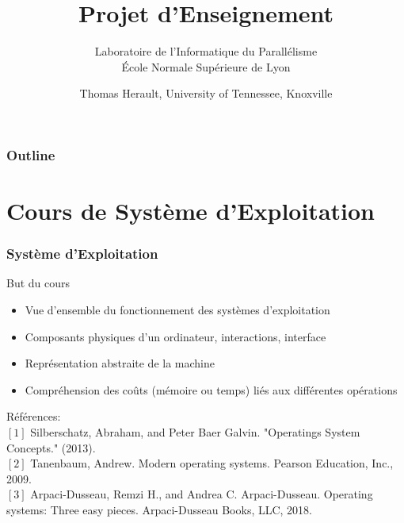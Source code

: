 \documentclass[compress,aspectratio=169]{beamer}
\title[Rencontre avec le Departement d'Informatique]{Projet d'Enseignement}
\subtitle{
  Laboratoire de l'Informatique du Parall\'elisme\\
  \'Ecole Normale Sup\'erieure de Lyon}
\author[herault@icl.utk.edu]{Thomas Herault, University of Tennessee, Knoxville}
\date[13 Mai 2024]{}
\begin{document}
\begin{frame}
  \titlepage
\end{frame}

\begin{frame}
     \frametitle{Outline}
     \tiny
        \tableofcontents
\end{frame}

\section{Cours de Syst\`eme d'Exploitation}

\begin{frame}
  \frametitle{Syst\`eme d'Exploitation}
  
  \begin{beamerboxesrounded}{But du cours}
    \begin{itemize}
    \item Vue d'ensemble du fonctionnement des syst\`emes d'exploitation
    \item Composants physiques d'un ordinateur, interactions, interface
    \item Repr\'esentation abstraite de la machine
    \item Compr\'ehension des co\^uts (m\'emoire ou temps) li\'es aux diff\'erentes op\'erations 
    \end{itemize}
  \end{beamerboxesrounded}
  
  \bigskip
  
  \small R\'ef\'erences:\\
  $[1]$ Silberschatz, Abraham, and Peter Baer Galvin. "Operatings System Concepts." (2013).\\
  $[2]$ Tanenbaum, Andrew. Modern operating systems. Pearson Education, Inc., 2009.\\
  $[3]$ Arpaci-Dusseau, Remzi H., and Andrea C. Arpaci-Dusseau. Operating systems: Three easy pieces. Arpaci-Dusseau Books, LLC, 2018.
  
\end{frame}
\end{document}
